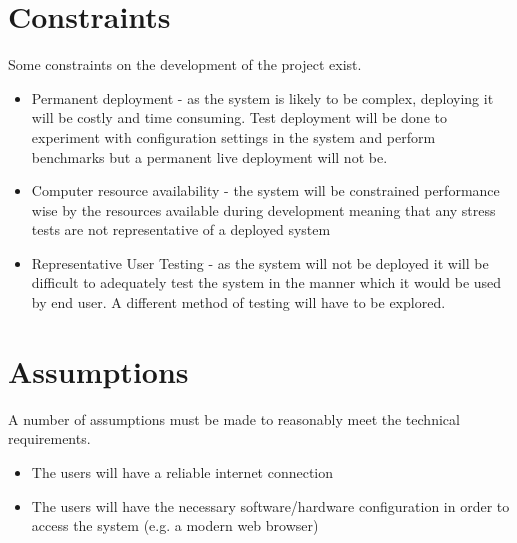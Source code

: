\section{Constraints} \label{section:probart-constraints}
Some constraints on the development of the project exist.

\begin{itemize}
    \item Permanent deployment - as the system is likely to be complex, deploying it will be costly and time consuming. Test deployment will be done to experiment with configuration settings in the system and perform benchmarks but a permanent live deployment will not be.
    \item Computer resource availability - the system will be constrained performance wise by the resources available during development meaning that any stress tests are not representative of a deployed system
    \item Representative User Testing - as the system will not be deployed it will be difficult to adequately test the system in the manner which it would be used by end user. A different method of testing will have to be explored.
\end{itemize}

\section{Assumptions} \label{section:probart-assumptions}
A number of assumptions must be made to reasonably meet the technical requirements.

\begin{itemize}
    \item The users will have a reliable internet connection
    \item The users will have the necessary software/hardware configuration in order to access the system (e.g. a modern web browser)
\end{itemize}